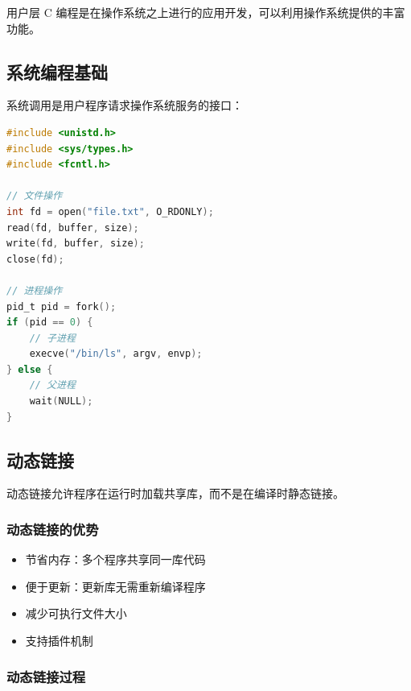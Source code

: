 用户层 C 编程是在操作系统之上进行的应用开发，可以利用操作系统提供的丰富功能。

\subsection{系统编程基础}


系统调用是用户程序请求操作系统服务的接口：

\begin{lstlisting}[language=C]
#include <unistd.h>
#include <sys/types.h>
#include <fcntl.h>

// 文件操作
int fd = open("file.txt", O_RDONLY);
read(fd, buffer, size);
write(fd, buffer, size);
close(fd);

// 进程操作
pid_t pid = fork();
if (pid == 0) {
    // 子进程
    execve("/bin/ls", argv, envp);
} else {
    // 父进程
    wait(NULL);
}
\end{lstlisting}

\subsection{动态链接}


动态链接允许程序在运行时加载共享库，而不是在编译时静态链接。

\subsubsection{动态链接的优势}

\begin{itemize}
  \item 节省内存：多个程序共享同一库代码
  \item 便于更新：更新库无需重新编译程序
  \item 减少可执行文件大小
  \item 支持插件机制
\end{itemize}

\subsubsection{动态链接过程}

